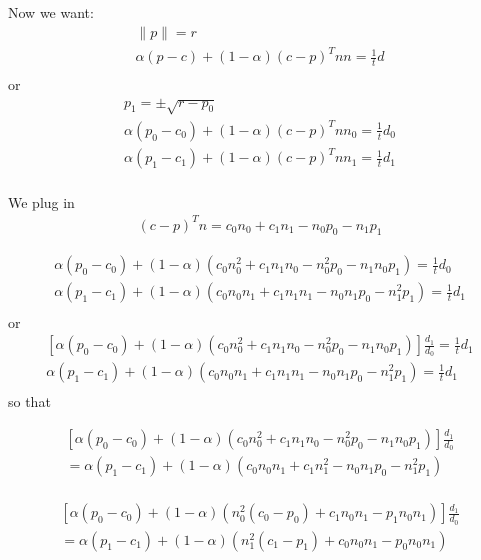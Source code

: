 \documentclass{article}
\begin{document}
Now we want:
\begin{align*}
\|p\| = r \\
\alpha (p - c) + (1 - \alpha) (c - p)^Tn n = \frac 1 t d \\
\end{align*}
or
\begin{align*}
p_1 = \pm \sqrt{r - p_0} \\
\alpha (p_0 - c_0) + (1 - \alpha) (c - p)^Tn n_0 = \frac 1 t d_0 \\
\alpha (p_1 - c_1) + (1 - \alpha) (c - p)^Tn n_1 = \frac 1 t d_1 \\
\end{align*}

We plug in
\begin{align*}
(c - p)^Tn = c_0 n_0 + c_1 n_1 - n_0 p_0 - n_1 p_1
\end{align*}

\begin{align*}
\alpha (p_0 - c_0) + (1 - \alpha) \left(c_0 n_0^2 + c_1 n_1 n_0 - n_0^2 p_0 - n_1 n_0 p_1\right) = \frac 1 t d_0 \\
\alpha (p_1 - c_1) + (1 - \alpha) \left(c_0 n_0n_1 + c_1 n_1n_1 - n_0n_1 p_0 - n_1^2 p_1\right) = \frac 1 t d_1 \\
\end{align*}
or
\begin{align*}
\left[\alpha (p_0 - c_0) + (1 - \alpha) \left(c_0 n_0^2 + c_1 n_1 n_0 - n_0^2 p_0 - n_1 n_0 p_1\right)\right] \frac{d_1}{d_0} = \frac 1 t d_1 \\
\alpha (p_1 - c_1) + (1 - \alpha) \left(c_0 n_0n_1 + c_1 n_1n_1 - n_0n_1 p_0 - n_1^2 p_1\right) = \frac 1 t d_1 \\
\end{align*}
so that

\begin{align*}
\left[\alpha (p_0 - c_0) + (1 - \alpha) \left(c_0 n_0^2 + c_1 n_1 n_0 - n_0^2 p_0 - n_1 n_0 p_1\right)\right] \frac{d_1}{d_0} \\
= \alpha (p_1 - c_1) + (1 - \alpha) \left(c_0 n_0n_1 + c_1 n_1^2 - n_0n_1 p_0 - n_1^2 p_1\right) \\
\end{align*}


\begin{align*}
\left[\alpha (p_0 - c_0) + (1 - \alpha) \left(n_0^2 \left(c_0 - p_0\right)  + c_1 n_0n_1 - p_1n_0 n_1\right)\right] \frac{d_1}{d_0} \\
= \alpha (p_1 - c_1) + (1 - \alpha) \left(n_1^2\left(c_1 -  p_1\right)+ c_0n_0n_1 - p_0n_0n_1\right) \\
\end{align*}
\end{document}
